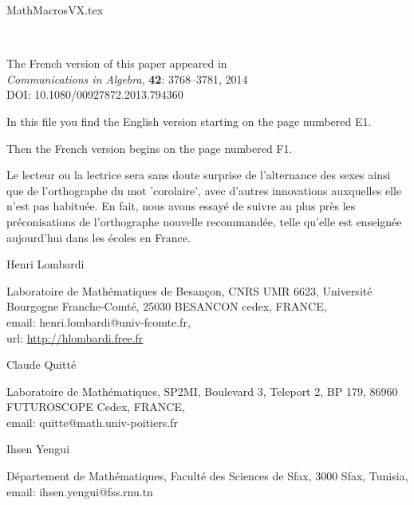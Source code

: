 \documentclass[11pt,a4paper,twoside]{article}
\begin{document}
 {MathMacrosVX.tex}

\thispagestyle{empty}
~ 

\noindent The French version of this paper appeared in\\  \emph{Communications in Algebra}, {\bf 42}: 3768–3781, 2014 
\\
DOI: 10.1080/00927872.2013.794360


\bigskip \noindent In this file you find the English version starting on the page  numbered E1.

\medskip {}

\bigskip \noindent  
Then the French version begins on the page numbered F1.



\medskip{} 

\smallskip \noindent Le lecteur ou la lectrice sera sans doute surprise de l'alternance des sexes ainsi que de l'orthographe du mot 'corolaire', avec d'autres innovations auxquelles elle n'est pas habituée. En fait, nous avons essayé de suivre au plus près les préconisations de l'orthographe nouvelle recommandée, telle qu'elle est enseignée aujourd'hui dans les écoles en France.  


\bigskip{}  



\smallskip 
\noindent Henri Lombardi

\noindent Laboratoire de Mathématiques de Besançon, CNRS UMR 6623, 
Université Bourgogne Franche-Comté, 25030 BESANCON cedex, FRANCE,\\
email: henri.lombardi@univ-fcomte.fr, \\
url: \url{http://hlombardi.free.fr}


\smallskip \noindent 
Claude Quitté

\noindent Laboratoire de Mathématiques,
SP2MI, Boulevard 3, Teleport 2, BP 179,
86960 FUTUROSCOPE Cedex, FRANCE,\\
email: quitte@math.univ-poitiers.fr

\smallskip \noindent Ihsen Yengui

\noindent 
Département de Mathématiques,  Faculté des Sciences de Sfax, 3000 Sfax,
Tunisia,\\ email: ihsen.yengui@fss.rnu.tn
\end{document}
